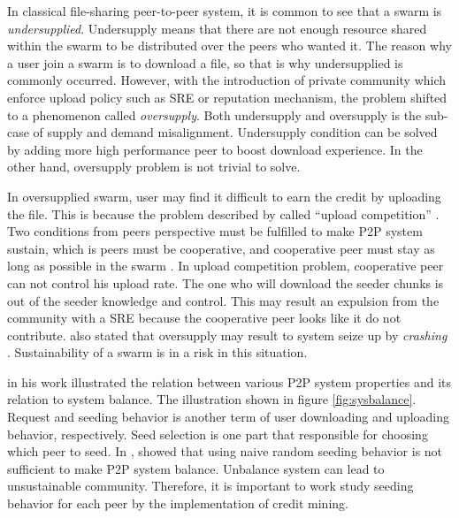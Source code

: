 In classical file-sharing peer-to-peer system, it is common to see that a swarm is \textit{undersupplied}. Undersupply means that there are not enough resource shared within the swarm to be distributed over the peers who wanted it. The reason why a user join a swarm is to download a file, so that is why undersupplied is commonly occurred. However, with the introduction of private community which enforce upload policy such as SRE or reputation mechanism, the problem shifted to a phenomenon called \textit{oversupply}. Both undersupply and oversupply is the sub-case of supply and demand misalignment. Undersupply condition can be solved by adding more high performance peer to boost download experience. In the other hand, oversupply problem is not trivial to solve.

In oversupplied swarm, user may find it difficult to earn the credit by uploading the file. This is because the problem described by \citeauthor{2011:managesupplydemand:meulpolder} called ``upload competition'' \cite{2011:managesupplydemand:meulpolder}. Two conditions from peers perspective must be fulfilled to make P2P system sustain, which is peers must be cooperative, and cooperative peer must stay as long as possible in the swarm \cite{2011:managesupplydemand:meulpolder}. In upload competition problem, cooperative peer can not control his upload rate. The one who will download the seeder chunks is out of the seeder knowledge and control. This may result an expulsion from the community with a SRE because the cooperative peer looks like it do not contribute. \citeauthor{2010:crashsustain:rahman} also stated that oversupply may result to system seize up by \textit{crashing}  \cite{2010:crashsustain:rahman}. Sustainability of a swarm is in a risk in this situation.

\citeauthor{2011:managesupplydemand:meulpolder} in his work illustrated the relation between various P2P system properties and its relation to system balance. The illustration shown in figure \ref{fig:sysbalance}. Request and seeding behavior is another term of user downloading and uploading behavior, respectively. Seed selection is one part that responsible for choosing which peer to seed. In \cite{2011:managesupplydemand:meulpolder}, \citeauthor{2011:managesupplydemand:meulpolder} showed that using naive random seeding behavior is not sufficient to make P2P system balance. Unbalance system can lead to unsustainable community. Therefore, it is important to work study seeding behavior for each peer by the implementation of credit mining.

